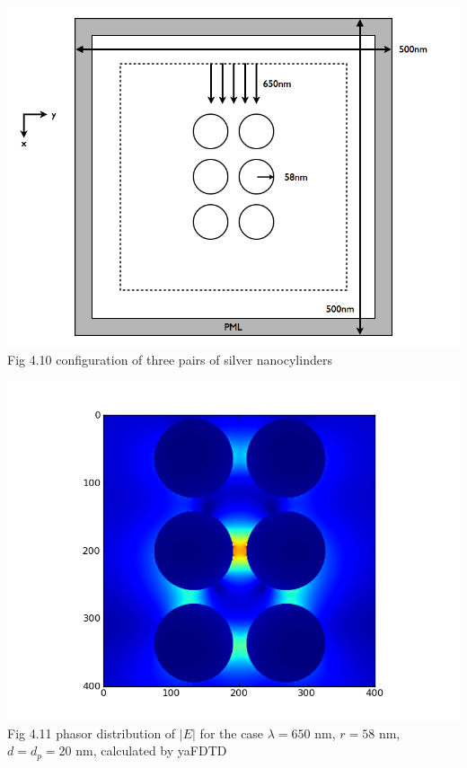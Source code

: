 \documentclass[openany]{book}
\begin{document}
\begin{center}
\includegraphics[scale=0.5]{images/open-cavity-config-r58.png}\\
Fig 4.10
configuration of three pairs of silver nanocylinders
\end{center}

\begin{center}
\includegraphics[scale=0.8]{images/etotal-r58.png}\\
Fig 4.11
phasor distribution of $|E|$ for the case $\lambda = 650$ nm, $r = 58$ nm, $d = d_p = 20$ nm, calculated by yaFDTD
\end{center}
\end{document}
